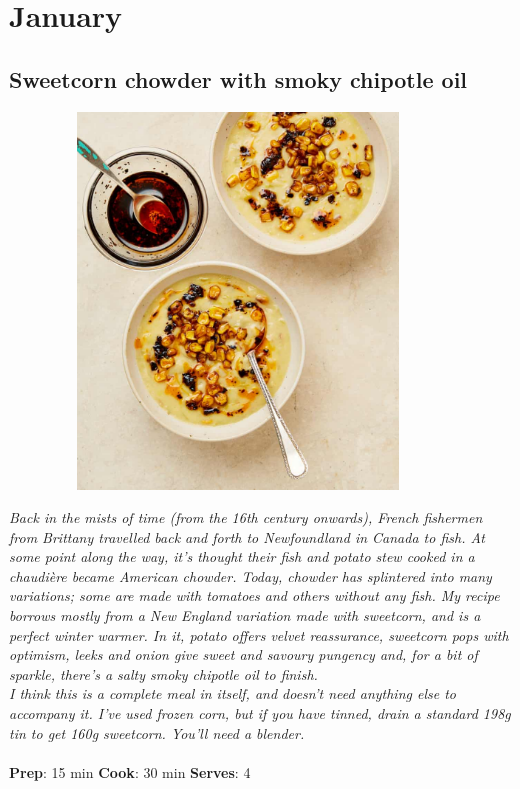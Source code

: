 \documentclass{book}
\begin{document}
\mainmatter
\chapter{January}
\section{Sweetcorn chowder with smoky chipotle oil}
\begin{figure}
\centering\includegraphics[width=10cm,height=10cm,keepaspectratio]{Recipe_Pictures/Sweetcorn_chowder_with_smoky_chipotle_oil.png}
\end{figure}
\emph{Back in the mists of time (from the 16th century onwards), French fishermen from Brittany travelled back and forth to Newfoundland in Canada to fish. At some point along the way, it’s thought their fish and potato stew cooked in a chaudière became American chowder. Today, chowder has splintered into many variations; some are made with tomatoes and others without any fish. My recipe borrows mostly from a New England variation made with sweetcorn, and is a perfect winter warmer. In it, potato offers velvet reassurance, sweetcorn pops with optimism, leeks and onion give sweet and savoury pungency and, for a bit of sparkle, there’s a salty smoky chipotle oil to finish.\\ 
I think this is a complete meal in itself, and doesn’t need anything else to accompany it. I’ve used frozen corn, but if you have tinned, drain a standard 198g tin to get 160g sweetcorn. You’ll need a blender.}\\\\ 
\textbf{Prep}: 15 min
\textbf{Cook}: 30 min
\textbf{Serves}: 4
\end{document}
